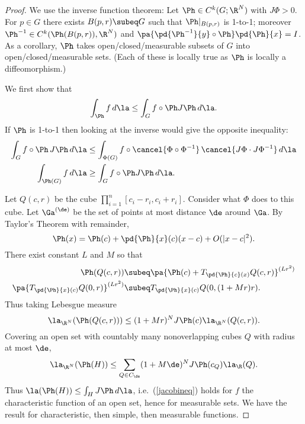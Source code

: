 \begin{proof}
We use the inverse function theorem: Let $\Ph\in C^k(G;\R^N)$ with $J\Phi>0$. For $p\in G$ there exists $B(p,r)\subeq G$ such that $\Ph|_{B(p,r)}$ is 1-to-1; moreover $\Ph^{-1}\in C^k(\Ph(B(p,r)),\R^N)$ and $\pa{\pd{\Ph^{-1}}{y}\circ \Ph}\pd{\Ph}{x}=I$.
As a corollary, $\Ph$ takes open/closed/measurable subsets of $G$ into open/closed/measurable sets. (Each of these is locally true as $\Ph$ is locally a diffeomorphism.)

We first show that %
\begin{equation}\label{jacobineq}
\int_{\Ph} f\,d\la\le\int_Gf\circ \Ph J\Ph \,d\la.
\end{equation}
If $\Ph$ is 1-to-1 then looking at the inverse would give the opposite inequality:
\begin{align*}
\int_G f\circ \Ph\,J\Ph\,d\la&\le\int_{\Phi(G)} f\circ \cancel{\Phi\circ \Phi^{-1}} \,\cancel{J\Phi\cdot J\Phi^{-1}}\,d\la\\
 \int_{\Ph(G)} f\,d\la&\ge\int_Gf\circ \Ph J\Ph \,d\la.
\end{align*}

Let $Q(c,r)$ be the cube $\prod_{i=1}^n [c_i-r_i,c_i+r_i]$. Consider what $\Phi$ does to this cube. Let $\Ga^{(\de)}$ be the set of points at most distance $\de$ around $\Ga$. 
By Taylor's Theorem with remainder,
\[
\Ph(x)=\Ph(c)+\pd{\Ph}{x}(c)(x-c)+O(|x-c|^2).
\]
There exist constant $L$ and $M$ so that 
\begin{align*}
\Ph(Q(c,r))&\subeq \pa{\Ph(c)+T_{\pd{\Ph}{c}(x)}Q(c,r)}^{(Lr^2)}\\
\pa{T_{\pd{\Ph}{x}(c)}Q(0,r)}^{(Lr^2)}&\subeq T_{\pd{\Ph}{x}(c)}Q(0,(1+Mr)r).
\end{align*}
Thus taking Lebesgue measure
\[
\la_{\R^N} (\Ph(Q(c,r)))\le (1+Mr)^N J\Ph(c)\la_{\R^N}(Q(c,r)).
\]
Covering an open set with countably many nonoverlapping cubes $Q$ with radius at most $\de$,
\[
\la_{\R^N}(\Ph(H))\le \sum_{Q\in C_{\de}} (1+M\de)^N J\Ph(c_Q)\la_{\R}(Q).
\]
Thus $\la(\Ph(H))\le \int_H J\Ph\,d\la$, i.e.~(\ref{jacobineq}) holds for $f$ the characteristic function of an open set, hence for measurable sets. We have the result for characteristic, then simple, then measurable functions.
\end{proof}